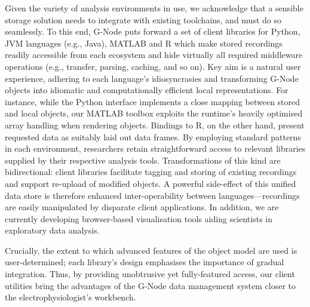 \documentclass[a4paper]{article}
\begin{document}
Given the variety of analysis environments in use, we acknowledge that
a sensible storage solution needs to integrate with existing
toolchains, and must do so seamlessly. To this end, G-Node puts
forward a set of client libraries for Python, JVM languages (e.g.,
Java), MATLAB and R which make stored recordings readily accessible
from each ecosystem and hide virtually all required middleware
operations (e.g., transfer, parsing, caching, and so on). Key aim is a
natural user experience, adhering to each language's idiosyncrasies
and transforming G-Node objects into idiomatic and computationally
efficient local representations. For instance, while the Python
interface implements a close mapping between stored and local objects,
our MATLAB toolbox exploits the runtime's heavily optimised array
handling when rendering objects. Bindings to R, on the other hand,
present requested data as suitably laid out data frames. By employing
standard patterns in each environment, researchers retain
straightforward access to relevant libraries supplied by their
respective analysis tools. Transformations of this kind are
bidirectional: client libraries facilitate tagging and storing of
existing recordings and support re-upload of modified objects. A
powerful side-effect of this unified data store is therefore enhanced
inter-operability between languages---recordings are easily
manipulated by disparate client applications. In addition, we are
currently developing browser-based visualisation tools aiding
scientists in exploratory data analysis.

Crucially, the extent to which advanced features of the object model
are used is user-determined; each library's design emphasises the
importance of gradual integration. Thus, by providing unobtrusive yet
fully-featured access, our client utilities bring the advantages of
the G-Node data management system closer to the electrophysiologist's
workbench.
\end{document}
